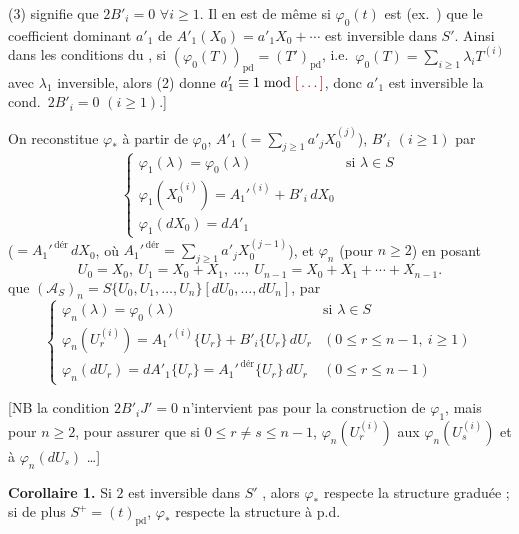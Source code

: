 \documentclass[11pt,a4paper]{article}
\begin{document}

(3) signifie que $2B'_{i}=0$ $\forall i\geq 1$. Il en est de même si $\varphi_{0}(t)$ est \ill{} (ex.\ \ill{}) \ill{} que le coefficient dominant $a'_{1}$ de $A'_{1}(X_{0})=a'_{1}X_{0}+\cdots$ est inversible dans $S'$. Ainsi dans les conditions du , si $(\varphi_{0}(T))_{\mathrm{pd}}=(T')_{\mathrm{pd}}$, i.e.\ $\varphi_{0}(T)=\sum_{i\geq 1}\lambda_{i}T^{(i)}$ avec $\lambda_{1}$ inversible, alors \ill{} (2) \ill{} donne $a'_{1}\equiv 1 \bmod \ill{}$, donc $a'_{1}$ est inversible \ill{} la cond.\ $2B'_{i}=0$ $(i\geq 1)$.]

On reconstitue \struck{$\varphi$} $\varphi_{*}$ à partir de $\varphi_{0}$, $A'_{1}$ ($=\sum_{j\geq 1}a'_{j}X_{0}^{(j)}$), $B'_{i}$ $(i\geq 1)$ par
\[
\begin{cases}
\varphi_{1}(\lambda)=\varphi_{0}(\lambda) & \text{si } \lambda\in S\\
\varphi_{1}(X_{0}^{(i)})=A_{1}'^{(i)}+B'_{i}\,dX_{0}\\
\varphi_{1}(dX_{0})=dA'_{1}
\end{cases}
\]
($=A_{1}'^{\,\mathrm{dér}}\,dX_{0}$, où $A_{1}'^{\,\mathrm{dér}}=\sum_{j\geq 1}a'_{j}X_{0}^{(j-1)}$), et $\varphi_{n}$ (pour $n\geq 2$) en posant
\[
U_{0}=X_{0},\ U_{1}=X_{0}+X_{1},\ \ldots,\ U_{n-1}=X_{0}+X_{1}+\cdots+X_{n-1}.
\]
 que $(\mathcal{A}_{S})_{n}=S\{U_{0},U_{1},\ldots,U_{n}\}[dU_{0},\ldots,dU_{n}]$, par
\[
\begin{cases}
\varphi_{n}(\lambda)=\varphi_{0}(\lambda) & \text{si } \lambda\in S\\
\varphi_{n}(U_{r}^{(i)})=A_{1}'^{(i)}\{U_{r}\}+B'_{i}\{U_{r}\}\,dU_{r} & (0\leq r\leq n-1,\ i\geq 1)\\
\varphi_{n}(dU_{r})=dA'_{1}\{U_{r}\}=A_{1}'^{\,\mathrm{dér}}\{U_{r}\}\,dU_{r} & (0\leq r\leq n-1)
\end{cases}
\]

[NB la condition $2B'_{i}J'=0$ n'intervient pas pour la construction de $\varphi_{1}$, mais  pour $n\geq 2$, pour assurer que si $0\leq r\neq s\leq n-1$, $\varphi_{n}(U_{r}^{(i)})$   aux $\varphi_{n}(U_{s}^{(i)})$ et à $\varphi_{n}(dU_{s})$ \ldots]

\textbf{Corollaire 1.} Si $2$ est inversible dans $S'$ , alors  $\varphi_{*}$ respecte la structure graduée ; si de plus $S^{+}=(t)_{\mathrm{pd}}$, $\varphi_{*}$ respecte la structure à p.d.\ 
\end{document}

